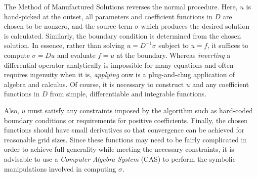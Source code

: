 The Method of Manufactured Solutions reverses the normal procedure.
Here, $u$ is hand-picked at the outset, all parameters and coefficient functions in $D$ are chosen to be nonzero, and the source term $\sigma$ which produces the desired solution is calculated.
Similarly, the boundary condition is determined from the chosen solution.
In essence, rather than solving $u = D^{-1}\sigma$ subject to $u=f$, it suffices to compute $\sigma = Du$ and evaluate $f=u$ at the boundary.
Whereas \textit{inverting} a differential operator analytically is impossible for many equations and often requires ingenuity when it is, \textit{applying} onw is a plug-and-chug application of algebra and calculus.
Of course, it is necessary to construct $u$ and any coefficient functions in $D$ from simple, differentiable and integrable functions.

Also, $u$ must satisfy any constraints imposed by the algorithm such as hard-coded boundary conditions or requirements for positive coefficients.
Finally, the chosen functions should have small derivatives so that convergence can be achieved for reasonable grid sizes.
Since these functions may need to be fairly complicated in order to achieve full generality while meeting the necessary constraints, it is advisable to use a \textit{Computer Algebra System} (CAS) to perform the symbolic manipulations involved in computing $\sigma$.

